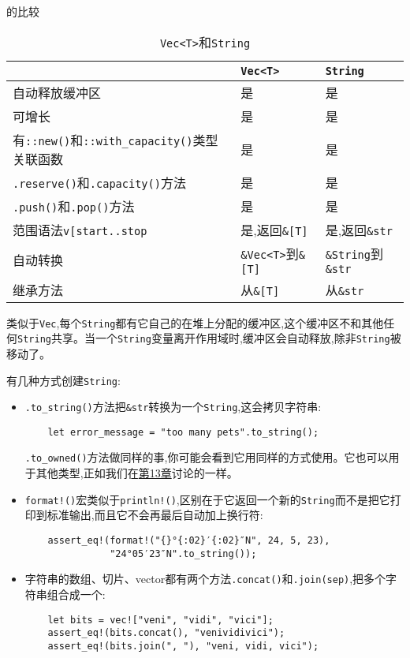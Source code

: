 \begin{table}[htbp]
    \centering
    \caption{\texttt{Vec<T>}和\texttt{String}}的比较
    \label{t3-11}
    \begin{tabular}{p{}p{}p{}}
        \hline
                    & \textbf{\texttt{Vec<T>}} & \textbf{\texttt{String}} \\
        \hline
        自动释放缓冲区 & 是 & 是 \\
        可增长       & 是 & 是 \\
        有\texttt{::new()}和\texttt{::with\_capacity()}类型关联函数 & 是 & 是 \\
        \texttt{.reserve()}和\texttt{.capacity()}方法 & 是 & 是 \\
        \texttt{.push()}和\texttt{.pop()}方法 & 是 & 是 \\
        范围语法\texttt{v[start..stop} & 是,返回\texttt{\&[T]} & 是,返回\texttt{\&str} \\
        自动转换      & \texttt{\&Vec<T>}到\texttt{\&[T]} & \texttt{\&String}到\texttt{\&str} \\
        继承方法      & 从\texttt{\&[T]} & 从\texttt{\&str} \\
    \end{tabular}
\end{table}

类似于\texttt{Vec},每个\texttt{String}都有它自己的在堆上分配的缓冲区,这个缓冲区不和其他任何\texttt{String}共享。当一个\texttt{String}变量离开作用域时,缓冲区会自动释放,除非\texttt{String}被移动了。

有几种方式创建\texttt{String}:
\begin{itemize}
    \item \texttt{.to\_string()}方法把\texttt{\&str}转换为一个\texttt{String},这会拷贝字符串:
    \begin{verbatim}
    let error_message = "too many pets".to_string();
    \end{verbatim}
    \texttt{.to\_owned()}方法做同样的事,你可能会看到它用同样的方式使用。它也可以用于其他类型,正如我们在\hyperref[ch13]{第13章}讨论的一样。

    \item \texttt{format!()}宏类似于\texttt{println!()},区别在于它返回一个新的\texttt{String}而不是把它打印到标准输出,而且它不会再最后自动加上换行符:
    \begin{verbatim}
    assert_eq!(format!("{}°{:02}′{:02}″N", 24, 5, 23),
               "24°05′23″N".to_string());
    \end{verbatim}

    \item 字符串的数组、切片、vector都有两个方法\texttt{.concat()}和\texttt{.join(sep)},把多个字符串组合成一个:
    \begin{verbatim}
    let bits = vec!["veni", "vidi", "vici"];
    assert_eq!(bits.concat(), "venividivici");
    assert_eq!(bits.join(", "), "veni, vidi, vici");
    \end{verbatim}
\end{itemize}

